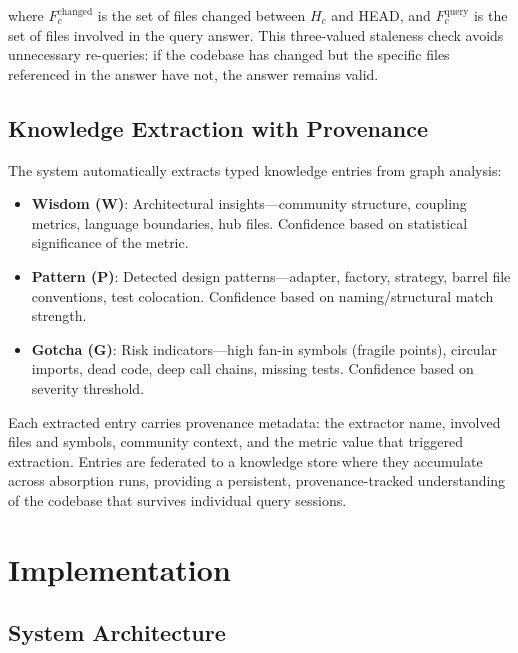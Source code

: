 \documentclass[conference]{IEEEtran}
\begin{document}
where $F_c^{\text{changed}}$ is the set of files changed between $H_c$
and HEAD, and $F_c^{\text{query}}$ is the set of files involved in the
query answer. This three-valued staleness check avoids unnecessary
re-queries: if the codebase has changed but the specific files
referenced in the answer have not, the answer remains valid.

\subsection{Knowledge Extraction with Provenance}
\label{sec:approach:knowledge}

The system automatically extracts typed knowledge entries from graph
analysis:

\begin{itemize}
  \item \textbf{Wisdom (W)}: Architectural insights---community
    structure, coupling metrics, language boundaries, hub files.
    Confidence based on statistical significance of the metric.
  \item \textbf{Pattern (P)}: Detected design patterns---adapter,
    factory, strategy, barrel file conventions, test colocation.
    Confidence based on naming/structural match strength.
  \item \textbf{Gotcha (G)}: Risk indicators---high fan-in symbols
    (fragile points), circular imports, dead code, deep call chains,
    missing tests. Confidence based on severity threshold.
\end{itemize}

Each extracted entry carries provenance metadata: the extractor name,
involved files and symbols, community context, and the metric value
that triggered extraction. Entries are federated to a knowledge store
where they accumulate across absorption runs, providing a persistent,
provenance-tracked understanding of the codebase that survives
individual query sessions.


\section{Implementation}
\label{sec:implementation}

\subsection{System Architecture}
\label{sec:impl:arch}
\end{document}
